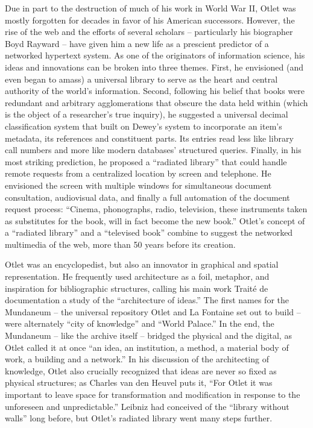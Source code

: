 Due in part to the destruction of much of his work in World War II, Otlet was mostly forgotten for decades in favor of his American successors. However, the rise of the web and the efforts of several scholars – particularly his biographer Boyd Rayward – have given him a new life as a prescient predictor of a networked hypertext system. As one of the originators of information science, his ideas and innovations can be broken into three themes. First, he envisioned (and even began to amass) a universal library to serve as the heart and central authority of the world’s information. Second, following his belief that books were redundant and arbitrary agglomerations that obscure the data held within (which is the object of a researcher’s true inquiry), he suggested a universal decimal classification system that built on Dewey’s system to incorporate an item’s metadata, its references and constituent parts. Its entries read less like library call numbers and more like modern databases’ structured queries. Finally, in his most striking prediction, he proposed a “radiated library” that could handle remote requests from a centralized location by screen and telephone. He envisioned the screen with multiple windows for simultaneous document consultation, audiovisual data, and finally a full automation of the document request process: “Cinema, phonographs, radio, television, these instruments taken as substitutes for the book, will in fact become the new book.”  Otlet’s concept of a “radiated library” and a “televised book” combine to suggest the networked multimedia of the web, more than 50 years before its creation.

Otlet was an encyclopedist, but also an innovator in graphical and spatial representation. He frequently used architecture as a foil, metaphor, and inspiration for bibliographic structures, calling his main work Traité de documentation a study of the “architecture of ideas.”  The first names for the Mundaneum – the universal repository Otlet and La Fontaine set out to build – were alternately “city of knowledge” and “World Palace.” In the end, the Mundaneum – like the archive itself – bridged the physical and the digital, as Otlet called it at once “an idea, an institution, a method, a material body of work, a building and a network.”  In his discussion of the architecting of knowledge, Otlet also crucially recognized that ideas are never so fixed as physical structures; as Charles van den Heuvel puts it, “For Otlet it was important to leave space for transformation and modification in response to the unforeseen and unpredictable.”  Leibniz had conceived of the “library without walls” long before, but Otlet’s radiated library went many steps further.

